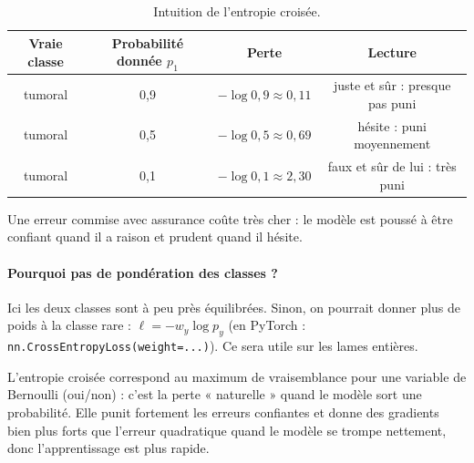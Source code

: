 \documentclass[11pt,a4paper]{article}
\begin{document}
\begin{table}[H]
\centering
\begin{tabular}{cccc}
\toprule
\textbf{Vraie classe} & \textbf{Probabilité donnée $p_1$} & \textbf{Perte} & \textbf{Lecture} \\
\midrule
tumoral & 0,9 & $-\log 0{,}9 \approx 0{,}11$ & juste et sûr : presque pas puni \\
tumoral & 0,5 & $-\log 0{,}5 \approx 0{,}69$ & hésite : puni moyennement \\
tumoral & 0,1 & $-\log 0{,}1 \approx 2{,}30$ & faux et sûr de lui : très puni \\
\bottomrule
\end{tabular}
\caption{Intuition de l'entropie croisée.}
\end{table}

Une erreur commise avec assurance coûte très cher : le modèle est poussé à être confiant quand il a raison et
prudent quand il hésite.

\paragraph{Pourquoi pas de pondération des classes ?} Ici les deux classes sont à peu près équilibrées.
Sinon, on pourrait donner plus de poids à la classe rare : $\ell = -w_y \log p_y$
(en PyTorch : \texttt{nn.CrossEntropyLoss(weight=...)}). Ce sera utile sur les lames entières.

\begin{oral}
L'entropie croisée correspond au maximum de vraisemblance pour une variable de Bernoulli (oui/non) : c'est la
perte « naturelle » quand le modèle sort une probabilité. Elle punit fortement les erreurs confiantes et
donne des gradients bien plus forts que l'erreur quadratique quand le modèle se trompe nettement, donc
l'apprentissage est plus rapide.
\end{oral}
\end{document}
